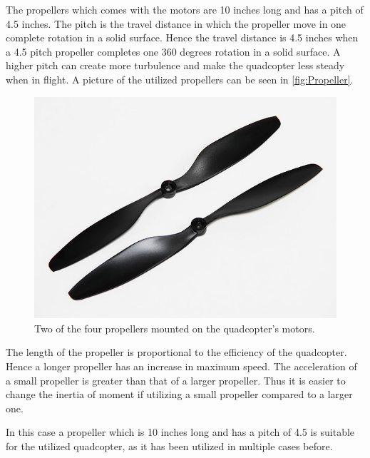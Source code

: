 The propellers which comes with the motors are 10 inches long and has a pitch of 4.5 inches. The pitch is the travel distance in which the propeller move in one complete rotation in a solid surface. Hence the travel distance is 4.5 inches when a 4.5 pitch propeller completes one 360 degrees rotation in a solid surface. A higher pitch can create more turbulence and make the quadcopter less steady when in flight. A picture of the utilized propellers can be seen in \autoref{fig:Propeller}.

\begin{figure}[H]
	\centering
	\includegraphics[scale=0.4]{figures/propeller.png}
	\caption{Two of the four propellers mounted on the quadcopter's motors.}
	\label{fig:Propeller}
\end{figure}

The length of the propeller is proportional to the efficiency of the quadcopter. Hence a longer propeller has an increase in maximum speed. The acceleration of a small propeller is greater than that of a larger propeller. Thus it is easier to change the inertia of moment if utilizing a small propeller compared to a larger one.  

In this case a propeller which is 10 inches long and has a pitch of 4.5 is suitable for the utilized quadcopter, as it has been utilized in multiple cases before. 



